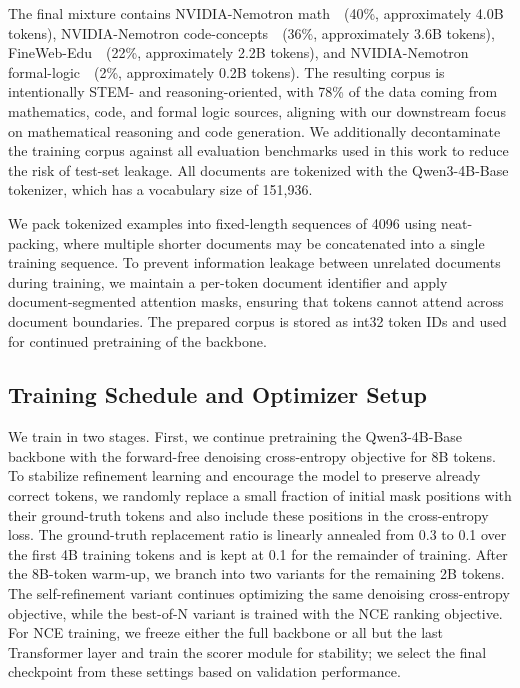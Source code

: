 The final mixture contains NVIDIA-Nemotron math~\citep{nemotron-cc-math}~(40\%, approximately 4.0B tokens), NVIDIA-Nemotron code-concepts~\citep{nemotron-code}~(36\%, approximately 3.6B tokens), FineWeb-Edu~\citep{fineweb-edu}~(22\%, approximately 2.2B tokens), and NVIDIA-Nemotron formal-logic~\citep{nemotron-code}~(2\%, approximately 0.2B tokens). 
The resulting corpus is intentionally STEM- and reasoning-oriented, with 78\% of the data coming from mathematics, code, and formal logic sources, aligning with our downstream focus on mathematical reasoning and code generation. 
We additionally decontaminate the training corpus against all evaluation benchmarks used in this work to reduce the risk of test-set leakage. 
All documents are tokenized with the Qwen3-4B-Base tokenizer, which has a vocabulary size of 151{,}936. 

We pack tokenized examples into fixed-length sequences of 4096 using neat-packing, where multiple shorter documents may be concatenated into a single training sequence. 
To prevent information leakage between unrelated documents during training, we maintain a per-token document identifier and apply document-segmented attention masks, ensuring that tokens cannot attend across document boundaries. 
The prepared corpus is stored as int32 token IDs and used for continued pretraining of the \method backbone.

\subsection{Training Schedule and Optimizer Setup}

We train \method in two stages. 
First, we continue pretraining the Qwen3-4B-Base backbone with the forward-free denoising cross-entropy objective for 8B tokens. 
To stabilize refinement learning and encourage the model to preserve already correct tokens, we randomly replace a small fraction of initial mask positions with their ground-truth tokens and also include these positions in the cross-entropy loss. 
The ground-truth replacement ratio is linearly annealed from 0.3 to 0.1 over the first 4B training tokens and is kept at 0.1 for the remainder of training. 
After the 8B-token warm-up, we branch into two variants for the remaining 2B tokens. 
The self-refinement variant continues optimizing the same denoising cross-entropy objective, while the best-of-N variant is trained with the NCE ranking objective. 
For NCE training, we freeze either the full backbone or all but the last Transformer layer and train the scorer module for stability; we select the final checkpoint from these settings based on validation performance.


